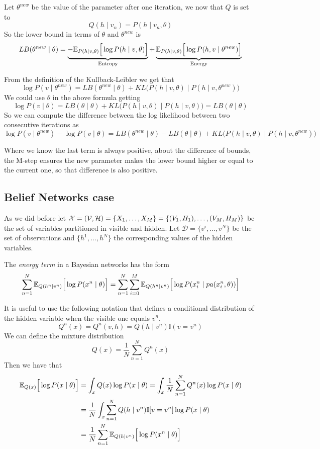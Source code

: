Let \(\theta^{new}\) be the value of the parameter after one iteration, we now that \(Q\) is set to
\[
  Q(h \mid v_{n}) = P(h \mid v_{n}, \theta)
\]
So the lower bound in terms of \(\theta\) and \(\theta^{new}\) is
\[
  LB(\theta^{new} \mid \theta) =  \underbrace{-\mathbb{E}_{P(h \mid v, \theta)}\Big[\log{P(h \mid v, \theta)}\Big]}_{\text{Entropy}} + \underbrace{\mathbb{E}_{P(h \mid v, \theta)}\Big[\log{P(h,v \mid \theta^{new})}\Big]}_{\text{Energy}}
\]

From the definition of the Kullback-Leibler we get that
\[
  \log{P(v \mid \theta^{new})} = LB(\theta^{new}\mid \theta) + KL\big( P(h \mid v, \theta) \mid P(h \mid v, \theta^{new})  \big)
\]
We could use \(\theta\) in the above formula getting
\[
  \log{P(v \mid \theta)} = LB(\theta \mid \theta) + KL\big( P(h \mid v, \theta) \mid P(h \mid v, \theta)  \big) = LB(\theta \mid \theta)
\]
So we can compute the difference between the log likelihood between two consecutive iterations as
\[
  \log{P(v \mid \theta^{new})} - \log{P(v \mid \theta)} = LB(\theta^{new}\mid \theta) - LB(\theta \mid \theta) +  KL\big( P(h \mid v, \theta) \mid P(h \mid v, \theta^{new})  \big)
\]

Where we know the last term is always positive, about the difference of bounds, the M-step ensures the new parameter makes the lower bound higher or equal to the current one, so that difference is also positive.

\subsection{Belief Networks case}

As we did before let \(\mathcal{X} = (\mathcal{V}, \mathcal{H}) = \{X_{1}, \dots , X_{M}\} = \{(V_{1}, H_{1}), \dots ,(V_{M}, H_{M})\}\) be the set of variables partitioned in visible and hidden. Let \(\mathcal{D} = \{v^{i},\dots,v^{N}\}\) be the set of observations and \(\{h^{1},\dots, h^{N}\}\) the corresponding values of the hidden variables.

The \emph{energy term} in a Bayesian networks has the form
\[
  \sum_{n=1}^{N} \mathbb{E}_{Q(h^{n}\mid v^{n})}\Big[ \log{P(x^{n} \mid \theta)} \Big] = \sum_{n = 1}^{N}\sum_{i = 0}^{M} \mathbb{E}_{Q(h^{n} \mid v^{n})}\Big[\log{P(x_{i}^{n} \mid pa(x_{i}^{n}, \theta))}\Big]
\]

It is useful to use the following notation that defines a conditional distribution of the hidden variable when the visible one equals \(v^{n}\).
\[
  Q^{n}(x) = Q^{n}(v,h) = Q(h \mid v^{n}) \mathbb{I}(v = v^{n})
\]
We can define the mixture distribution
\[
  Q(x) = \frac{1}{N}\sum_{n = 1}^{N}Q^{n}(x)
\]
Then we have that
\[
  \begin{aligned}
    \mathbb{E}_{Q(x)}\Big[\log{P(x \mid \theta)}\Big] &= \int_{x}Q(x)\log{P(x \mid \theta)} =  \int_{x} \frac{1}{N}\sum_{n=1}^{N}Q^{n}(x)\log{P(x \mid \theta)} \\
    &= \frac{1}{N} \int_{x}\sum_{n=1}^{N}Q(h \mid v^{n})\mathbb{I}[v = v^{n}]\log{P(x \mid \theta)}\\
    &= \frac{1}{N}\sum_{n = 1}^{N}\mathbb{E}_{Q(h \mid v^{n})}\Big[\log{P(x^{n} \mid \theta)}\Big]
  \end{aligned}
\]

